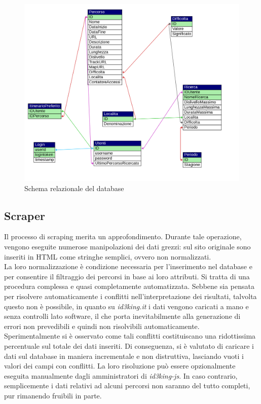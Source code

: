 \documentclass[11pt]{report}
\begin{document}
\begin{figure}[h]
	\centering
	\includegraphics[scale=0.45]{DB_schema}
	\caption{Schema relazionale del database \label{db_schema}}
\end{figure}
\subsection{Scraper}
Il processo di scraping merita un approfondimento.
Durante tale operazione, vengono eseguite numerose manipolazioni dei dati grezzi: sul sito originale sono inseriti in HTML come stringhe semplici, ovvero non normalizzati.
\\La loro normalizzazione è condizione necessaria per l'inserimento nel database e per consentire il filtraggio dei percorsi in base ai loro attributi.
Si tratta di una procedura complessa e quasi completamente automatizzata.
Sebbene sia pensata per risolvere automaticamente i conflitti nell'interpretazione dei risultati, talvolta questo non è possibile, in quanto su \textit{id3king.it} i dati vengono caricati a mano e senza controlli lato software, il che porta inevitabilmente alla generazione di errori non prevedibili e quindi non risolvibili automaticamente.
\\Sperimentalmente si è osservato come tali conflitti costituiscano una ridottissima percentuale sul totale dei dati inseriti.
Di conseguenza, si è valutato di caricare i dati sul database in maniera incrementale e non distruttiva, lasciando vuoti i valori dei campi con conflitti.
La loro risoluzione può essere opzionalmente eseguita manualmente dagli amministratori di \textit{id3king-js}.
In caso contrario, semplicemente i dati relativi ad alcuni percorsi non saranno del tutto completi, pur rimanendo fruibili in parte.
\end{document}

